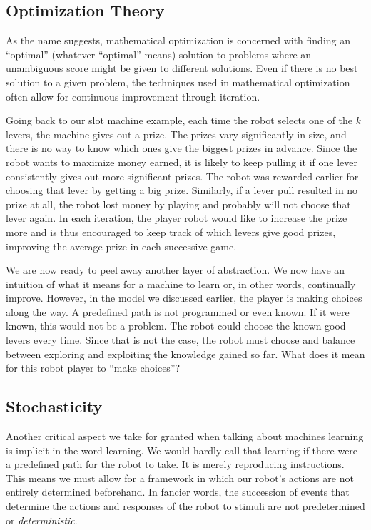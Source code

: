 \subsection{Optimization Theory}

As the name suggests, mathematical optimization
is concerned with finding an ``optimal'' (whatever ``optimal'' means) solution
to problems where an unambiguous score might be given to different solutions.
Even if there is no best solution to a given problem, the techniques used in
mathematical optimization often allow for continuous improvement through
iteration.

Going back to our slot machine example, each time the robot selects one of the
$k$ levers, the machine gives out a prize. The prizes vary significantly in
size, and there is no way to know which ones give the biggest prizes in advance.
Since the robot wants to maximize money earned, it is likely to keep pulling it
if one lever consistently gives out more significant prizes. The robot was
rewarded earlier for choosing that lever by getting a big prize. Similarly, if a
lever pull resulted in no prize at all, the robot lost money by playing and
probably will not choose that lever again. In each iteration, the player robot
would like to increase the prize more and is thus encouraged to keep track of
which levers give good prizes, improving the average prize in each successive
game.

We are now ready to peel away another layer of abstraction. We now have an
intuition of what it means for a machine to learn or, in other words,
continually improve. However, in the model we discussed earlier, the player is
making choices along the way. A predefined path is not programmed or even known.
If it were known, this would not be a problem. The robot could choose the
known-good levers every time. Since that is not the case, the robot must choose
and balance between exploring and exploiting the knowledge gained so far. What
does it mean for this robot player to ``make choices''?

\subsection{Stochasticity}
Another critical aspect we take for granted when
talking about machines learning is implicit in the word learning. We would
hardly call that learning if there were a predefined path for the robot to take.
It is merely reproducing instructions. This means we must allow for a framework
in which our robot's actions are not entirely determined beforehand. In fancier
words, the succession of events that determine the actions and responses of the
robot to stimuli are not predetermined or \textit{deterministic}.

